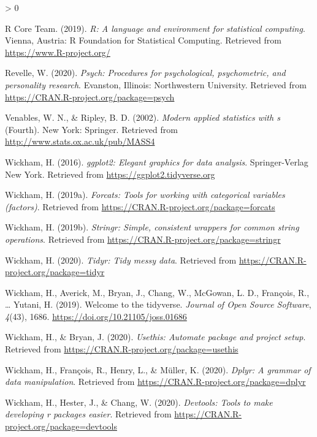 \documentclass[
  english,
  man, fleqn, noextraspace]{apa6}
\newlength{\cslhangindent}
\newenvironment{CSLReferences}[2] %
 {%
  \setlength{\parindent}{0pt}
  \ifodd #1 \everypar{\setlength{\hangindent}{\cslhangindent}}\ignorespaces\fi
  \ifnum #2 > 0
  \setlength{\parskip}{#2\baselineskip}
  \fi
 }%
 {}
\begin{document}
\begin{CSLReferences}{1}{0}
\leavevmode\hypertarget{ref-R-base}{}%
R Core Team. (2019). \emph{R: A language and environment for statistical computing}. Vienna, Austria: R Foundation for Statistical Computing. Retrieved from \url{https://www.R-project.org/}

\leavevmode\hypertarget{ref-R-psych}{}%
Revelle, W. (2020). \emph{Psych: Procedures for psychological, psychometric, and personality research}. Evanston, Illinois: Northwestern University. Retrieved from \url{https://CRAN.R-project.org/package=psych}

\leavevmode\hypertarget{ref-R-MASS}{}%
Venables, W. N., \& Ripley, B. D. (2002). \emph{Modern applied statistics with s} (Fourth). New York: Springer. Retrieved from \url{http://www.stats.ox.ac.uk/pub/MASS4}

\leavevmode\hypertarget{ref-R-ggplot2}{}%
Wickham, H. (2016). \emph{ggplot2: Elegant graphics for data analysis}. Springer-Verlag New York. Retrieved from \url{https://ggplot2.tidyverse.org}

\leavevmode\hypertarget{ref-R-forcats}{}%
Wickham, H. (2019a). \emph{Forcats: Tools for working with categorical variables (factors)}. Retrieved from \url{https://CRAN.R-project.org/package=forcats}

\leavevmode\hypertarget{ref-R-stringr}{}%
Wickham, H. (2019b). \emph{Stringr: Simple, consistent wrappers for common string operations}. Retrieved from \url{https://CRAN.R-project.org/package=stringr}

\leavevmode\hypertarget{ref-R-tidyr}{}%
Wickham, H. (2020). \emph{Tidyr: Tidy messy data}. Retrieved from \url{https://CRAN.R-project.org/package=tidyr}

\leavevmode\hypertarget{ref-R-tidyverse}{}%
Wickham, H., Averick, M., Bryan, J., Chang, W., McGowan, L. D., François, R., \ldots{} Yutani, H. (2019). Welcome to the {tidyverse}. \emph{Journal of Open Source Software}, \emph{4}(43), 1686. \url{https://doi.org/10.21105/joss.01686}

\leavevmode\hypertarget{ref-R-usethis}{}%
Wickham, H., \& Bryan, J. (2020). \emph{Usethis: Automate package and project setup}. Retrieved from \url{https://CRAN.R-project.org/package=usethis}

\leavevmode\hypertarget{ref-R-dplyr}{}%
Wickham, H., François, R., Henry, L., \& Müller, K. (2020). \emph{Dplyr: A grammar of data manipulation}. Retrieved from \url{https://CRAN.R-project.org/package=dplyr}

\leavevmode\hypertarget{ref-R-devtools}{}%
Wickham, H., Hester, J., \& Chang, W. (2020). \emph{Devtools: Tools to make developing r packages easier}. Retrieved from \url{https://CRAN.R-project.org/package=devtools}


\end{CSLReferences}
\end{document}
